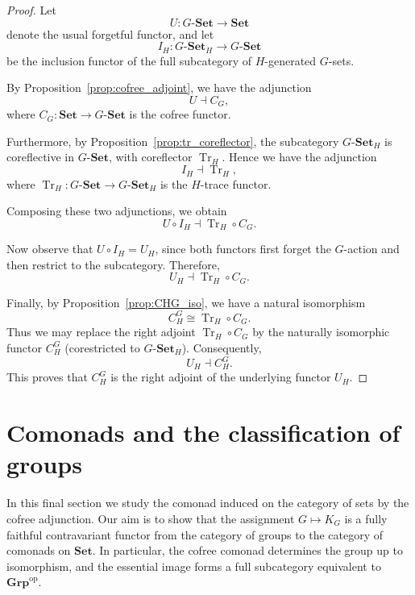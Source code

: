 \documentclass[10pt,a4paper]{amsart}
\begin{document}
\begin{proof}
Let
\[
U \colon G\text{-}\mathbf{Set} \longrightarrow \mathbf{Set}
\]
denote the usual forgetful functor, and let
\[
I_H \colon G\text{-}\mathbf{Set}_H \longrightarrow G\text{-}\mathbf{Set}
\]
be the inclusion functor of the full subcategory of $H$-generated $G$-sets.

By Proposition~\ref{prop:cofree_adjoint}, we have the adjunction
\[
U \dashv C_G,
\]
where $C_G \colon \mathbf{Set} \longrightarrow G\text{-}\mathbf{Set}$ is the cofree functor.

Furthermore, by Proposition~\ref{prop:tr_coreflector}, the subcategory $G\text{-}\mathbf{Set}_H$ is coreflective in $G\text{-}\mathbf{Set}$, with coreflector $\operatorname{Tr}_H$. Hence we have the adjunction
\[
I_H \dashv \operatorname{Tr}_H,
\]
where $\operatorname{Tr}_H \colon G\text{-}\mathbf{Set} \longrightarrow G\text{-}\mathbf{Set}_H$ is the $H$-trace functor.

Composing these two adjunctions, we obtain
\[
U \circ I_H \dashv \operatorname{Tr}_H \circ C_G.
\]

Now observe that $U \circ I_H = U_H$, since both functors first forget the $G$-action and then restrict to the subcategory. Therefore,
\[
U_H \dashv \operatorname{Tr}_H \circ C_G.
\]

Finally, by Proposition~\ref{prop:CHG_iso}, we have a natural isomorphism
\[
C_H^G \cong \operatorname{Tr}_H \circ C_G.
\]
Thus we may replace the right adjoint $\operatorname{Tr}_H \circ C_G$ by the naturally isomorphic functor $C_H^G$ (corestricted to $G\text{-}\mathbf{Set}_H$). Consequently,
\[
U_H \dashv C_H^G.
\]
This proves that $C_H^G$ is the right adjoint of the underlying functor $U_H$.
\end{proof}

\section{Comonads and the classification of groups}
\label{sec:comonads}

In this final section we study the comonad induced on the category of sets by the cofree adjunction. Our aim is to show that the assignment $G \mapsto K_G$ is a fully faithful contravariant functor from the category of groups to the category of comonads on $\mathbf{Set}$. In particular, the cofree comonad determines the group up to isomorphism, and the essential image forms a full subcategory equivalent to $\mathbf{Grp}^{\mathrm{op}}$.
\end{document}
